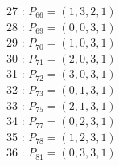 \documentclass{article}
\begin{document}
{\begin{multicols}{3}
27 : $P_{66}=( 1, 3, 2, 1 )$\\
28 : $P_{69}=( 0, 0, 3, 1 )$\\
29 : $P_{70}=( 1, 0, 3, 1 )$\\
30 : $P_{71}=( 2, 0, 3, 1 )$\\
31 : $P_{72}=( 3, 0, 3, 1 )$\\
32 : $P_{73}=( 0, 1, 3, 1 )$\\
33 : $P_{75}=( 2, 1, 3, 1 )$\\
34 : $P_{77}=( 0, 2, 3, 1 )$\\
35 : $P_{78}=( 1, 2, 3, 1 )$\\
36 : $P_{81}=( 0, 3, 3, 1 )$\\
\end{multicols}


%


%


}%
\end{document}
